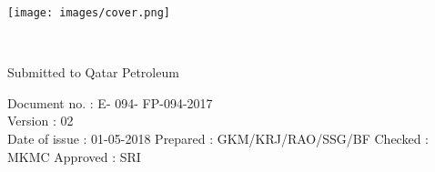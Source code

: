 \documentclass[
12pt, %
oneside, %
english, %
singlespacing, %
nolistspacing, %
liststotoc, %
parskip, %
headsepline, %
chapterinoneline, %
]{MastersDoctoralThesis} %
\author{Qatar Design Consortium} %
\begin{document}
\frontmatter %

\pagestyle{plain} %


\begin{titlepage}
\begin{center}

\begin{center}
\texttt{[image: images/cover.png]} %
\end{center}
{\huge \bfseries \ttitle\par}\vspace{0.4cm} %
\HRule \\[1.5cm] %
\begin{minipage}[t]{0.4\textwidth}
\begin{flushleft} \large
\end{flushleft}
\end{minipage}

\huge Submitted to Qatar Petroleum
\vfill
\end{center}

Document no.	:	E- 094- FP-094-2017 \\
Version		:	02 \\
Date of issue	:	01-05-2018
Prepared	:  	GKM/KRJ/RAO/SSG/BF
Checked	:	MKMC	
Approved	: 	SRI	

\end{titlepage}

\cleardoublepage
\end{document}
